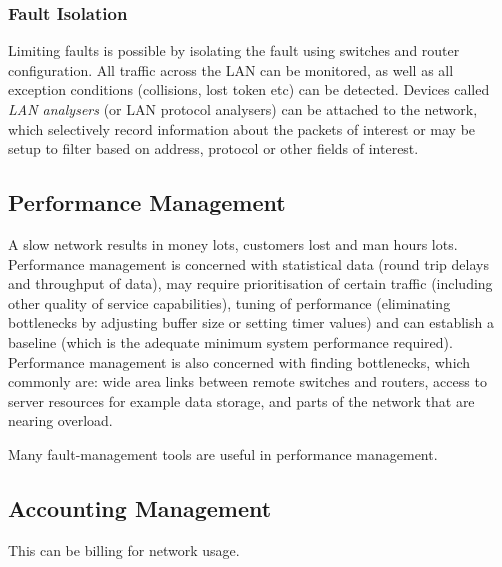 \subsubsection*{Fault Isolation}
Limiting faults is possible by isolating the fault using switches and router configuration. All traffic across the LAN can be monitored, as well as all exception conditions (collisions, lost token etc) can be detected. Devices called \textit{LAN analysers} (or LAN protocol analysers) can be attached to the network, which selectively record information about the packets of interest or may be setup to filter based on address, protocol or other fields of interest. 

\subsection*{Performance Management}
A slow network results in money lots, customers lost and man hours lots. Performance management is concerned with statistical data (round trip delays and throughput of data), may require prioritisation of certain traffic (including other quality of service capabilities), tuning of performance (eliminating bottlenecks by adjusting buffer size or setting timer values) and can establish a baseline (which is the adequate minimum system performance required). 
Performance management is also concerned with finding bottlenecks, which commonly are: wide area links between remote switches and routers, access to server resources for example data storage, and parts of the network that are nearing overload.

Many fault-management tools are useful in performance management.

\subsection*{Accounting Management}
This can be billing for network usage. 


